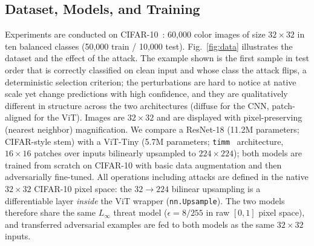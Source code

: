 \documentclass[conference]{IEEEtran}
\newcommand{\eps}{\epsilon}
\begin{document}
\subsection{Dataset, Models, and Training}
Experiments are conducted on CIFAR-10~\cite{krizhevsky2009learning}: 60{,}000 color images of size $32\times32$ in ten balanced classes (50{,}000 train / 10{,}000 test). Fig.~\ref{fig:data} illustrates the dataset and the effect of the attack. The example shown is the first sample in test order that is correctly classified on clean input and whose class the attack flips, a deterministic selection criterion; the perturbations are hard to notice at native scale yet change predictions with high confidence, and they are qualitatively different in structure across the two architectures (diffuse for the CNN, patch-aligned for the ViT). Images are $32\times32$ and are displayed with pixel-preserving (nearest neighbor) magnification. We compare a ResNet-18 (11.2M parameters; CIFAR-style stem) with a ViT-Tiny (5.7M parameters; \texttt{timm}~\cite{rw2019timm} architecture, $16\times16$ patches over inputs bilinearly upsampled to $224\times224$); both models are trained from scratch on CIFAR-10 with basic data augmentation and then adversarially fine-tuned. All operations including attacks are defined in the native $32\times32$ CIFAR-10 pixel space: the $32\to224$ bilinear upsampling is a differentiable layer \emph{inside} the ViT wrapper (\texttt{nn.Upsample}). The two models therefore share the same $L_\infty$ threat model ($\eps=8/255$ in raw $[0,1]$ pixel space), and transferred adversarial examples are fed to both models as the same $32\times32$ inputs.
\end{document}
